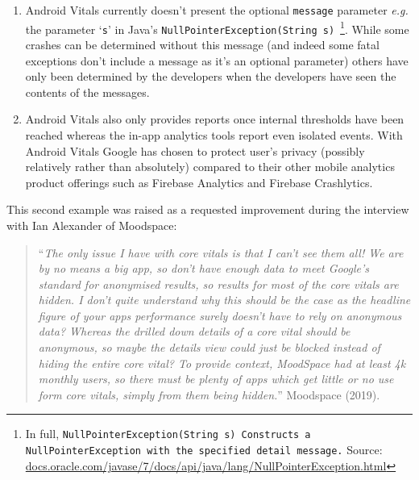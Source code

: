 \begin{enumerate}
    \item Android Vitals currently doesn't present the optional \texttt{message} parameter \textit{e.g.} the parameter `\texttt{s}' in Java's \texttt{NullPointerException(String s)}~\footnote{In full, \texttt{NullPointerException(String s)
Constructs a NullPointerException with the specified detail message.} Source:  \href{https://docs.oracle.com/javase/7/docs/api/java/lang/NullPointerException.html}{docs.oracle.com/javase/7/docs/api/java/lang/NullPointerException.html}}. While some crashes can be determined without this message (and indeed some fatal exceptions don't include a message as it's an optional parameter) others have only been determined by the developers when the developers have seen the contents of the messages.
    \item Android Vitals also only provides reports once internal thresholds have been reached whereas the in-app analytics tools report even isolated events. With Android Vitals Google has chosen to protect user's privacy (possibly relatively rather than absolutely) compared to their other mobile analytics product offerings such as Firebase Analytics and Firebase Crashlytics.
\end{enumerate}

This second example was raised as a requested improvement during the interview with Ian Alexander of Moodspace:
\begin{quote}
    ``\textit{The only issue I have with core vitals is that I can't see them all! We are by no means a big app, so don't have enough data to meet Google's standard for anonymised results, so results for most of the core vitals are hidden. I don't quite understand why this should be the case as the headline figure of your apps performance surely doesn't have to rely on anonymous data? Whereas the drilled down details of a core vital should be anonymous, so maybe the details view could just be blocked instead of hiding the entire core vital? To provide context, MoodSpace had at least 4k monthly users, so there must be plenty of apps which get little or no use form core vitals, simply from them being hidden.}'' Moodspace (2019).
\end{quote}

